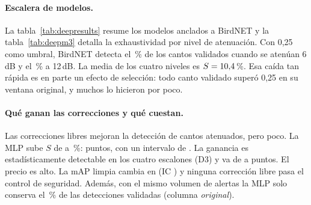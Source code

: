 \paragraph{Escalera de modelos.}
La tabla~\ref{tab:deepresults} resume los modelos anclados a BirdNET y la tabla~\ref{tab:deepm3} detalla la exhaustividad por nivel de atenuación.
Con 0,25 como umbral, BirdNET detecta el \deepAttBirdnetSix\,\% de los cantos validados cuando se atenúan 6\,dB y el \deepAttBirdnetTwelve\,\% a 12\,dB.
La media de los cuatro niveles es $S = 10{,}4$\,\%. Esa caída tan rápida es en parte un efecto de selección: todo canto validado
superó 0,25 en su ventana original, y muchos lo hicieron por poco.

\begin{table}[H]
  \centering\small
  \caption{Modelos anclados a BirdNET, con predicciones fuera de muestra. M1 es el control de seguridad (D1: el intervalo de $\Delta$ no baja de $-0{,}01$).
  En M3, \emph{original} es la fracción de cantos validados sin atenuar que el modelo sigue marcando con el mismo volumen de alertas, y $S$ es la media
  de los niveles de 6 a 24\,dB (D3: el intervalo de $\Delta S$ queda por encima de cero).}\label{tab:deepresults}
\end{table}

\begin{table}[H]
  \centering\small
  \caption{Exhaustividad (\%) sobre cantos validados, por nivel de atenuación, con el mismo volumen de alertas que BirdNET. Última columna:
  media de los niveles atenuados con un 1\,\% de falsas alarmas sobre ventanas donde BirdNET calla.}\label{tab:deepm3}
\end{table}

\paragraph{Qué ganan las correcciones y qué cuestan.}
Las correcciones libres mejoran la detección de cantos atenuados, pero poco. La MLP sube $S$ de \deepAttBirdnet{} a \deepAttMlp\,\%: \deepAttDeltaMlp{} puntos,
con un intervalo de \deepAttCiMlp. La ganancia es estadísticamente detectable en los cuatro escalones (D3) y va de \deepAttDeltaLinear{} a \deepAttDeltaDeep{}
puntos. El precio es alto. La mAP limpia cambia en \deepCleanDeltaMlp{} (IC \deepCleanCiMlp) y ninguna corrección libre
pasa el control de seguridad. Además, con el mismo volumen de alertas la MLP solo conserva el \deepAttMlpZero\,\% de las detecciones validadas
(columna \emph{original}).

